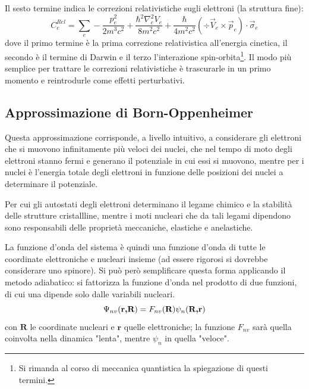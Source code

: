 Il sesto termine indica le correzioni relativistiche sugli elettroni (la struttura fine):
\[ C_e^{Rel} = \sum_e - \frac{p_e^2}{2 m^3 c^2} + \frac{\hbar^2\nabla_e^2 V_e}{8 m^2 c^2} + \frac{\hbar}{4 m^2 c^2}(\div{\vec{V}_e} \times \vec{p}_e)\cdot \vec{\sigma}_e\]
dove il primo termine è la prima correzione relativistica all'energia cinetica, il secondo è il termine di Darwin e il terzo l'interazione spin-orbita\footnote{Si rimanda al corso di meccanica quantistica la spiegazione di questi termini.}.
Il modo più semplice per trattare le correzioni relativistiche è trascurarle in un primo momento e reintrodurle come effetti perturbativi.

\subsection{Approssimazione di Born-Oppenheimer}

Questa approssimazione corrisponde, a livello intuitivo, a considerare gli elettroni che si muovono infinitamente più veloci dei nuclei, che nel tempo di moto degli elettroni stanno fermi e generano il potenziale in cui essi si muovono, mentre per i nuclei è l'energia totale degli elettroni in funzione delle posizioni dei nuclei a determinare il potenziale.

Per cui gli autostati degli elettroni determinano il legame chimico e la stabilità delle strutture cristallline, mentre i moti nucleari che da tali legami dipendono sono responsabili delle proprietà meccaniche, elastiche e anelastiche.
\newline

La funzione d'onda del sistema è quindi una funzione d'onda di tutte le coordinate elettroniche e nucleari insieme (ad essere rigorosi si dovrebbe considerare uno spinore).
Si può però semplificare questa forma applicando il metodo adiabatico: si fattorizza la funzione d'onda nel prodotto di due funzioni, di cui una dipende solo dalle variabili nucleari.
\[ \Psi_{nv} (\textbf{r,R}) = F_{nv}(\textbf{R}) \psi_{n}(\textbf{R,\textbf{r}}) \]
con $ \textbf{R} $ le coordinate nucleari e $ \textbf{r} $ quelle elettroniche; la funzione $ F_{nv} $ sarà quella coinvolta nella dinamica "lenta", mentre $ \psi_{n} $ in quella "veloce".

